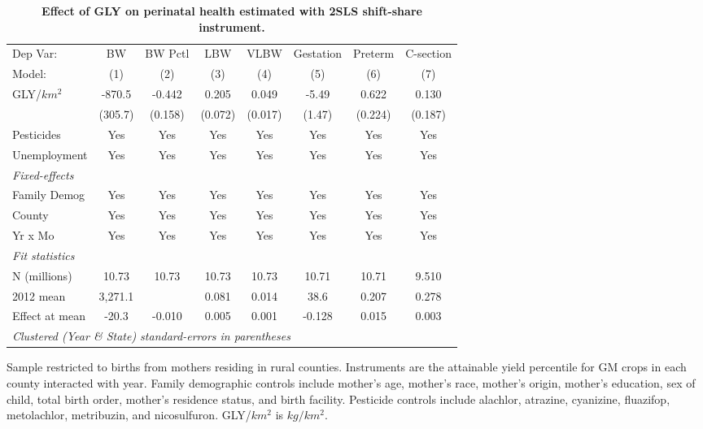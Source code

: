 \begin{table}[htbp]
   \centering
   \begin{threeparttable}[b]
      \caption{\label{tab:main-outcomes-ss} \textbf{Effect of GLY on perinatal health estimated with 2SLS shift-share instrument.}}
      \begin{tabular}{lccccccc}
         \toprule
         Dep Var:       & BW      & BW Pctl & LBW     & VLBW    & Gestation & Preterm & C-section\\  
         Model:         & (1)     & (2)     & (3)     & (4)     & (5)       & (6)     & (7)\\  
         \midrule 
         GLY/$km^2$     & -870.5  & -0.442  & 0.205   & 0.049   & -5.49     & 0.622   & 0.130\\   
                        & (305.7) & (0.158) & (0.072) & (0.017) & (1.47)    & (0.224) & (0.187)\\   
         Pesticides     & Yes     & Yes     & Yes     & Yes     & Yes       & Yes     & Yes\\  
         Unemployment   & Yes     & Yes     & Yes     & Yes     & Yes       & Yes     & Yes\\  
         \midrule
         \emph{Fixed-effects}\\
         Family Demog   & Yes     & Yes     & Yes     & Yes     & Yes       & Yes     & Yes\\  
         County         & Yes     & Yes     & Yes     & Yes     & Yes       & Yes     & Yes\\  
         Yr x Mo        & Yes     & Yes     & Yes     & Yes     & Yes       & Yes     & Yes\\  
         \midrule
         \emph{Fit statistics}\\
         N (millions)   & 10.73   & 10.73   & 10.73   & 10.73   & 10.71     & 10.71   & 9.510\\  
         2012 mean      & 3,271.1 &         & 0.081   & 0.014   & 38.6      & 0.207   & 0.278\\  
         Effect at mean & -20.3   & -0.010  & 0.005   & 0.001   & -0.128    & 0.015   & 0.003\\  
         \midrule
         \multicolumn{8}{l}{\emph{Clustered (Year \& State) standard-errors in parentheses}}\\
      \end{tabular}
      
      \begin{tablenotes}\item Sample restricted to births from mothers residing in rural counties. Instruments are the attainable yield percentile for GM crops in each county interacted with year. Family demographic controls include mother's age, mother's race, mother's origin, mother's education, sex of child, total birth order, mother's residence status, and birth facility. Pesticide controls include alachlor, atrazine, cyanizine, fluazifop, metolachlor, metribuzin, and nicosulfuron. GLY/$km^2$ is $kg/km^2$.
      \end{tablenotes}
   \end{threeparttable}
\end{table}
